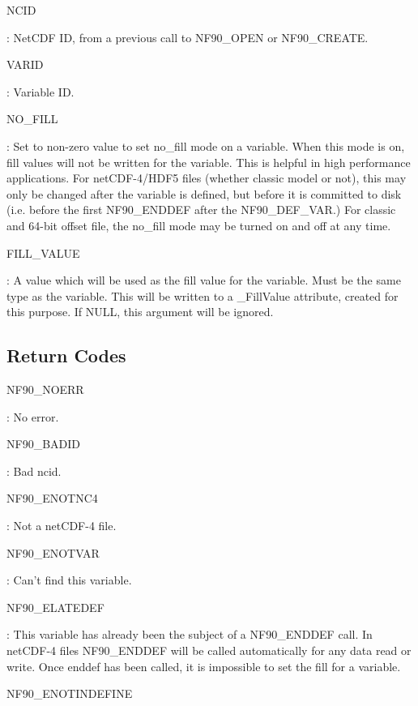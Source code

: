 {\ttfamily N\+C\+ID}

\+: Net\+C\+DF ID, from a previous call to N\+F90\+\_\+\+O\+P\+EN or N\+F90\+\_\+\+C\+R\+E\+A\+TE.

{\ttfamily V\+A\+R\+ID}

\+: Variable ID.

{\ttfamily N\+O\+\_\+\+F\+I\+LL}

\+: Set to non-\/zero value to set no\+\_\+fill mode on a variable. When this mode is on, fill values will not be written for the variable. This is helpful in high performance applications. For net\+C\+D\+F-\/4/\+H\+D\+F5 files (whether classic model or not), this may only be changed after the variable is defined, but before it is committed to disk (i.\+e. before the first N\+F90\+\_\+\+E\+N\+D\+D\+EF after the N\+F90\+\_\+\+D\+E\+F\+\_\+\+V\+AR.) For classic and 64-\/bit offset file, the no\+\_\+fill mode may be turned on and off at any time.

{\ttfamily F\+I\+L\+L\+\_\+\+V\+A\+L\+UE}

\+: A value which will be used as the fill value for the variable. Must be the same type as the variable. This will be written to a \+\_\+\+Fill\+Value attribute, created for this purpose. If N\+U\+LL, this argument will be ignored.

\subsection*{Return Codes}

{\ttfamily N\+F90\+\_\+\+N\+O\+E\+RR}

\+: No error.

{\ttfamily N\+F90\+\_\+\+B\+A\+D\+ID}

\+: Bad ncid.

{\ttfamily N\+F90\+\_\+\+E\+N\+O\+T\+N\+C4}

\+: Not a net\+C\+D\+F-\/4 file.

{\ttfamily N\+F90\+\_\+\+E\+N\+O\+T\+V\+AR}

\+: Can’t find this variable.

{\ttfamily N\+F90\+\_\+\+E\+L\+A\+T\+E\+D\+EF}

\+: This variable has already been the subject of a N\+F90\+\_\+\+E\+N\+D\+D\+EF call. In net\+C\+D\+F-\/4 files N\+F90\+\_\+\+E\+N\+D\+D\+EF will be called automatically for any data read or write. Once enddef has been called, it is impossible to set the fill for a variable.

{\ttfamily N\+F90\+\_\+\+E\+N\+O\+T\+I\+N\+D\+E\+F\+I\+NE}

